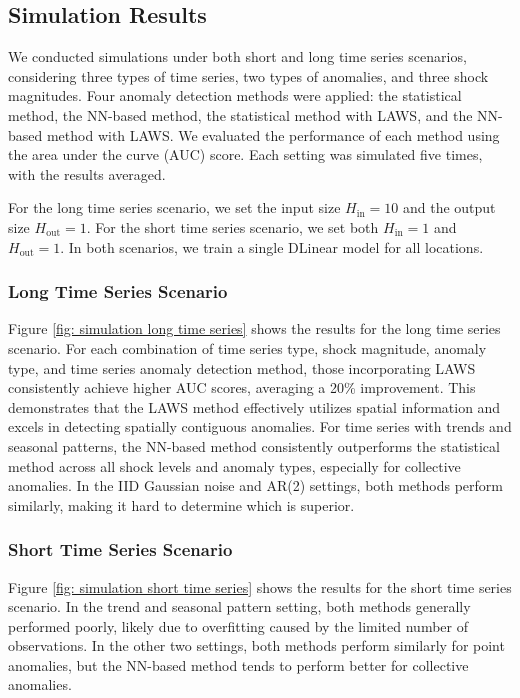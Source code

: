 \documentclass[11pt]{article}
\begin{document}
\subsection{Simulation Results}
We conducted simulations under both short and long time series scenarios, considering three types of time series, two types of anomalies, and three shock magnitudes. Four anomaly detection methods were applied: the statistical method, the NN-based method, the statistical method with LAWS, and the NN-based method with LAWS. We evaluated the performance of each method using the area under the curve (AUC) score. Each setting was simulated five times, with the results averaged.


For the long time series scenario, we set the input size $H_{\mathrm{in}}=10$ and the output size $H_{\mathrm{out}}=1$. For the short time series scenario, we set both $H_{\mathrm{in}}=1$ and $H_{\mathrm{out}}=1$. In both scenarios, we train a single DLinear model for all locations.
\subsubsection*{Long Time Series Scenario}
Figure \ref{fig: simulation long time series} shows the results for the long time series scenario. For each combination of time series type, shock magnitude, anomaly type, and time series anomaly detection method, those incorporating LAWS consistently achieve higher AUC scores, averaging a 20\% improvement. This demonstrates that the LAWS method effectively utilizes spatial information and excels in detecting spatially contiguous anomalies. For time series with trends and seasonal patterns, the NN-based method consistently outperforms the statistical method across all shock levels and anomaly types, especially for collective anomalies. In the IID Gaussian noise and AR(2) settings, both methods perform similarly, making it hard to determine which is superior.

\subsubsection*{Short Time Series Scenario}
Figure \ref{fig: simulation short time series} shows the results for the short time series scenario. In the trend and seasonal pattern setting, both methods generally performed poorly, likely due to overfitting caused by the limited number of observations. In the other two settings, both methods perform similarly for point anomalies, but the NN-based method tends to perform better for collective anomalies. 
\end{document}
